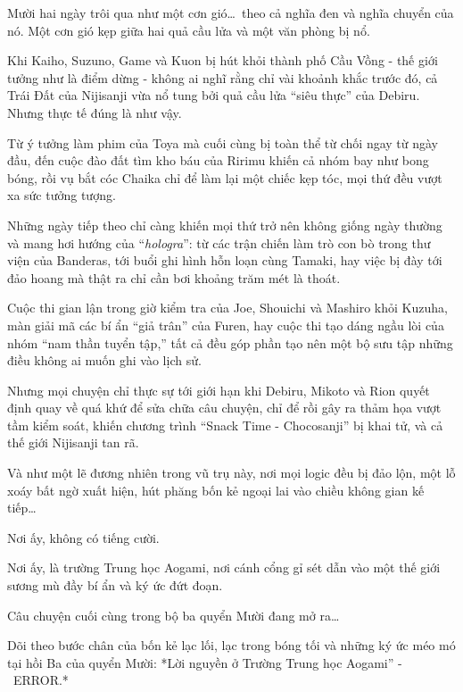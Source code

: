 \documentclass[main.tex]{subfiles}
\begin{document}
Mười hai ngày trôi qua như một cơn gió\dots\ theo cả nghĩa đen và nghĩa chuyển của nó. Một cơn gió kẹp giữa hai quả cầu lửa và một văn phòng bị nổ.

Khi Kaiho, Suzuno, Game và Kuon bị hút khỏi thành phố Cầu Vồng - thế giới tưởng như là điểm dừng - không ai nghĩ rằng chỉ vài khoảnh khắc trước đó, cả Trái Đất của Nijisanji vừa nổ tung bởi quả cầu lửa ``siêu thực'' của Debiru. Nhưng thực tế đúng là như vậy.

Từ ý tưởng làm phim của Toya mà cuối cùng bị toàn thể từ chối ngay từ ngày đầu, đến cuộc đào đất tìm kho báu của Ririmu khiến cả nhóm bay như bong bóng, rồi vụ bắt cóc Chaika chỉ để làm lại một chiếc kẹp tóc, mọi thứ đều vượt xa sức tưởng tượng.

Những ngày tiếp theo chỉ càng khiến mọi thứ trở nên không giống ngày thường và mang hơi hướng của ``\textit{hologra}'': từ các trận chiến làm trò con bò trong thư viện của Banderas, tới buổi ghi hình hỗn loạn cùng Tamaki, hay việc bị đày tới đảo hoang mà thật ra chỉ cần bơi khoảng trăm mét là thoát.

Cuộc thi gian lận trong giờ kiểm tra của Joe, Shouichi và Mashiro khỏi Kuzuha, màn giải mã các bí ẩn ``giả trân'' của Furen, hay cuộc thi tạo dáng ngầu lòi của nhóm ``nam thần tuyển tập,'' tất cả đều góp phần tạo nên một bộ sưu tập những điều không ai muốn ghi vào lịch sử.

Nhưng mọi chuyện chỉ thực sự tới giới hạn khi Debiru, Mikoto và Rion quyết định  quay về quá khứ để sửa chữa câu chuyện, chỉ để rồi gây ra thảm họa vượt tầm kiểm soát, khiến chương trình ``Snack Time - Chocosanji'' bị khai tử, và cả thế giới Nijisanji tan rã.

Và như một lẽ đương nhiên trong vũ trụ này, nơi mọi logic đều bị đảo lộn, một lỗ xoáy bất ngờ xuất hiện, hút phăng bốn kẻ ngoại lai vào chiều không gian kế tiếp\dots

Nơi ấy, không có tiếng cười.

Nơi ấy, là trường Trung học Aogami, nơi cánh cổng gỉ sét dẫn vào một thế giới sương mù đầy bí ẩn và ký ức đứt đoạn.

Câu chuyện cuối cùng trong bộ ba quyển Mười đang mở ra\dots

Dõi theo bước chân của bốn kẻ lạc lối, lạc trong bóng tối và những ký ức méo mó tại hồi Ba của quyển Mười:
*Lời nguyền ở Trường Trung học Aogami'' - \hll\ ERROR.*
\end{document}
